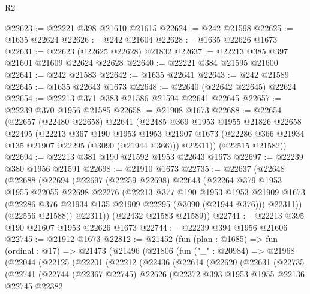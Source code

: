 \begin{lexlean}{R2}
\begin{coremodule}
@22623 := @22221 @398 @21610 @21615
@22624 := @242 @21598
@22625 := @1635 @22624
@22626 := @242 @21604
@22628 := @1635 @22626 @1673
@22631 := @22623 (@22625 @22628) @21832
@22637 := @22213 @385 @397 @21601 @21609 @22624 @22628
@22640 := @22221 @384 @21595 @21600
@22641 := @242 @21583
@22642 := @1635 @22641
@22643 := @242 @21589
@22645 := @1635 @22643 @1673
@22648 := @22640 (@22642 @22645) @22624
@22654 := @22213 @371 @383 @21586 @21594 @22641 @22645
@22657 := @22239 @370 @1956 @21585
@22658 := @21908 @1673
@22688 := @22654
    (@22657
      (@22480 @22658)
      @22641
      (@22485
        @369
        @1953
        @1955
        @21826
        @22658
        @22495
        (@22213
          @367
          @190
          @1953
          @1953
          @21907
          @1673
          (@22286 @366 @21934 @135 @21907 @22295 (@3090 (@21944 @366)))
          @22311))
      (@22515 @21582))
@22694 := @22213 @381 @190 @21592 @1953 @22643 @1673
@22697 := @22239 @380 @1956 @21591
@22698 := @21910 @1673
@22735 := @22637
    (@22648
      (@22688
        (@22694
          (@22697
            (@22259 @22698)
            @22643
            (@22264
              @379
              @1953
              @1955
              @22055
              @22698
              @22276
              (@22213
                @377
                @190
                @1953
                @1953
                @21909
                @1673
                (@22286 @376 @21934 @135 @21909 @22295 (@3090 (@21944 @376)))
                @22311))
            (@22556 @21588))
          @22311))
      (@22432 @21583 @21589))
@22741 := @22213 @395 @190 @21607 @1953 @22626 @1673
@22744 := @22239 @394 @1956 @21606
@22745 := @21912 @1673
@22812 := @21452
    (fun (plan : @1685) =>
    fun (ordinal : @17) =>
    @21473
      (@21496
        (@21806
          (fun ("_" : @20984) =>
          @21968
            (@22044
              (@22125
                (@22201
                  (@22212
                    (@22436
                      (@22614
                        (@22620
                          (@22631
                            (@22735
                              (@22741
                                (@22744
                                  (@22367 @22745)
                                  @22626
                                  (@22372
                                    @393
                                    @1953
                                    @1955
                                    @22136
                                    @22745
                                    @22382

\end{coremodule}
\end{lexlean}
